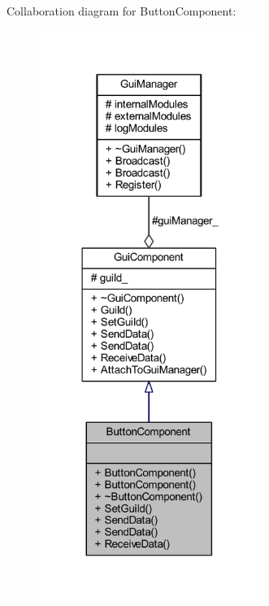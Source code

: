Collaboration diagram for Button\+Component\+:
\nopagebreak
\begin{figure}[H]
\begin{center}
\leavevmode
\includegraphics[width=206pt]{class_button_component__coll__graph}
\end{center}
\end{figure}
